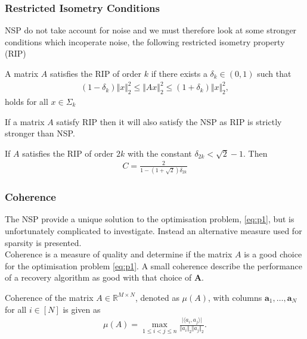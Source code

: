 
\subsubsection{Restricted Isometry Conditions}
NSP do not take account for noise and we must therefore look at some stronger conditions which incoperate noise, the following restricted isometry property (RIP) %

\begin{definition}
A matrix $A$ satisfies the RIP of order $k$ if there exists a $\delta_k \in (0,1)$ such that
\begin{align*}
(1 - \delta_k) \Vert x \Vert_2^2 \leq \Vert Ax \Vert_2^2 \leq (1 + \delta_k) \Vert x \Vert_2^2,
\end{align*}
holds for all $x \in \Sigma_k$
\end{definition}


If a matrix $A$ satisfy RIP then it will also satisfy the NSP as RIP is strictly stronger than NSP.
\begin{theorem}
If $A$ satisfies the RIP of order $2k$ with the constant $\delta_{2k} < \sqrt{2} -1$. Then
\begin{align*}
C = \frac{2}{1 - (1 + \sqrt{2}) \delta_{2k}}
\end{align*}
\end{theorem} 

\subsubsection{Coherence}
The NSP provide a unique solution to the optimisation problem, \eqref{eq:p1}, but is unfortunately complicated to investigate. Instead an alternative measure used for sparsity is presented.
\\%
Coherence is a measure of quality and determine if the matrix $A$ is a good choice for the optimisation problem \eqref{eq:p1}. A small coherence describe the performance of a recovery algorithm as good with that choice of $\mathbf{A}$. 
\begin{definition}[Coherence]
Coherence of the matrix $A \in \mathbb{R}^{M \times N}$, denoted as $\mu (A)$, with columns $\mathbf{a}_1, \dots, \mathbf{a}_N$ for all $i \in [N]$ is given as
\begin{align*}
\mu (A) = \max_{1 \leq i < j \leq n} \frac{\vert \langle a_i, a_j \rangle \vert}{\Vert a_i \Vert_2 \Vert a_j \Vert_2}.
\end{align*}
\end{definition}


